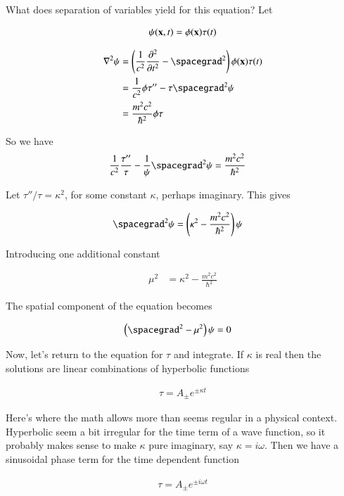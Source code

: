 \documentclass{article}
\newcommand{\PDSq}[2]{\frac{\partial^2 {#2}}{\partial {#1}^2}}
\begin{document}
What does separation of variables yield for this equation?  Let

\begin{align*}
\psi(\mathbf{x},t) = \phi(\mathbf{x})\tau(t)
\end{align*}

\begin{align*}
\grad^2 \psi 
&= \left(\inv{c^2} \PDSq{t}{} - \spacegrad^2 \right) \phi(\Bx)\tau(t) \\
&= \inv{c^2} \phi\tau'' - \tau \spacegrad^2 \psi \\
&= \frac{m^2 c^2}{\hbar^2}\phi\tau
\end{align*}

So we have
\begin{align*}
\inv{c^2} \frac{\tau''}{\tau} - \inv{\psi} \spacegrad^2 \psi &= \frac{m^2 c^2}{\hbar^2}
\end{align*}

Let $\tau''/\tau = \kappa^2$, for some constant $\kappa$, perhaps imaginary. This gives

\begin{align*}
\spacegrad^2 \psi &= \left( \kappa^2 - \frac{m^2 c^2}{\hbar^2} \right) \psi
\end{align*}

Introducing one additional constant

\begin{align*}
\mu^2 &= \kappa^2 - \frac{m^2 c^2}{\hbar^2} 
\end{align*}

The spatial component of the equation becomes

\begin{align*}
\left( \spacegrad^2 - \mu^2 \right) \psi &= 0
\end{align*}

Now, let's return to the equation for $\tau$ and integrate.  If $\kappa$ is real then the solutions are linear
combinations of hyperbolic functions

\begin{align*}
\tau = A_{\pm} e^{\pm \kappa t} 
\end{align*}

Here's where the math allows more than seems regular in a physical context.  Hyperbolic seem a bit irregular for the time term of a wave function, so it probably makes sense to make $\kappa$ 
pure imaginary, say $\kappa = i \omega$.  Then we have a sinusoidal phase term for the time dependent function

\begin{align*}
\tau = A_{\pm} e^{\pm i \omega t} 
\end{align*}
\end{document}
